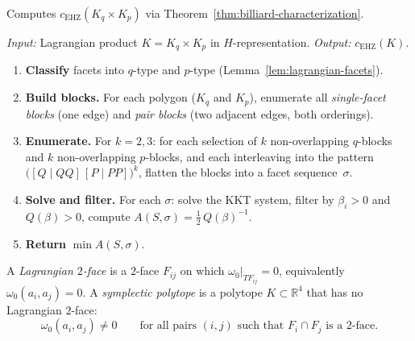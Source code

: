 \begin{unverified}
\begin{algorithm}\label{alg:billiard}
Computes $c_{\mathrm{EHZ}}(K_q \times K_p)$
via Theorem~\ref{thm:billiard-characterization}.

\emph{Input:} Lagrangian product $K = K_q \times K_p$ in
$H$-representation.
\quad
\emph{Output:} $c_{\mathrm{EHZ}}(K)$.

\begin{enumerate}
\item \textbf{Classify} facets into $q$-type and $p$-type
  (Lemma~\ref{lem:lagrangian-facets}).
\item \textbf{Build blocks.}
  For each polygon ($K_q$ and $K_p$), enumerate all
  \emph{single-facet blocks} (one edge) and
  \emph{pair blocks} (two adjacent edges, both orderings).
\item \textbf{Enumerate.}
  For $k = 2, 3$: for each selection of $k$ non-overlapping
  $q$-blocks and $k$ non-overlapping $p$-blocks, and each
  interleaving into the pattern
  $\bigl([Q \mid QQ]\,[P \mid PP]\bigr)^k$,
  flatten the blocks into a facet sequence~$\sigma$.
\item \textbf{Solve and filter.}
  For each $\sigma$: solve the KKT system,
  filter by $\beta_i > 0$ and $Q(\beta) > 0$, compute
  $A(S, \sigma) = \tfrac{1}{2}\, Q(\beta)^{-1}$.
\item \textbf{Return} $\min A(S, \sigma)$.
\end{enumerate}
\end{algorithm}
\end{unverified}



\begin{unverified}
\begin{definition}\label{def:symplectic-polytope}
A \emph{Lagrangian $2$-face} is a $2$-face $F_{ij}$ on which
$\omega_0|_{T F_{ij}} = 0$, equivalently $\omega_0(a_i, a_j) = 0$.
A \emph{symplectic polytope} is a polytope $K \subset \mathbb{R}^4$
that has no Lagrangian $2$-face:
\[
  \omega_0(a_i, a_j) \neq 0
  \qquad \text{for all pairs } (i,j)
  \text{ such that } F_i \cap F_j \text{ is a $2$-face.}
\]
\end{definition}
\end{unverified}


